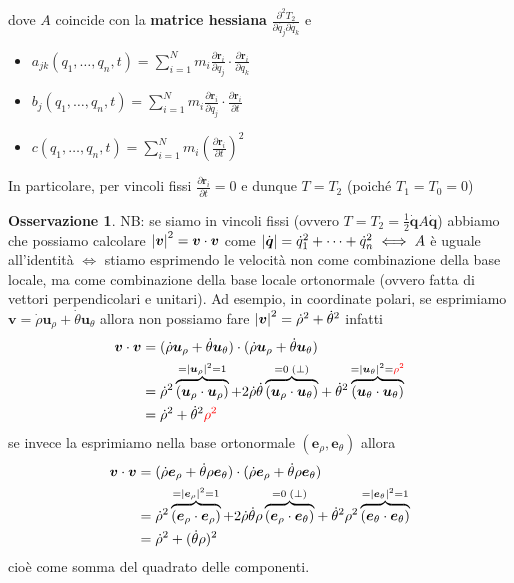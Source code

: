 \documentclass[a4paper,10pt]{article}
\theoremstyle{definition}
\newcommand{\bv}{\boldsymbol} %
\theoremstyle{indentdefinition}
\theoremstyle{indenttheorem}
\theoremstyle{myremark}
\newtheorem*{rem*}{Osservazione}
\theoremstyle{indentgeneral}
\begin{document}
dove $A$ coincide con la \textbf{matrice hessiana} $\frac{\partial^2T_2}{\partial\dot{q_j}\partial\dot{q_k}}$ e 
\begin{itemize}
    \item $a_{jk}(q_1,\dots,q_n,t)=\sum_{i=1}^{N}m_{i}\frac{\partial\boldsymbol{r}_{i}}{\partial q_{j}}\cdot\frac{\partial\boldsymbol{r}_{i}}{\partial q_{k}}$
    \item $b_{j}(q_1,\dots,q_n,t)=\sum_{i=1}^{N}m_{i}\frac{\partial\boldsymbol{r}_{i}}{\partial q_{j}}\cdot\frac{\partial\boldsymbol{r}_{i}}{\partial t}$
    \item $c(q_1,\dots,q_n,t)=\sum_{i=1}^{N}m_{i}\left(\frac{\partial\boldsymbol{r}_{i}}{\partial t}\right)^{2}$
\end{itemize}
In particolare, per vincoli fissi $\frac{\partial\boldsymbol{r}_{i}}{\partial t}=0$
e dunque $T=T_{2}$ (poiché $T_{1}=T_{0}=0$)

\begin{rem*}
    NB: se siamo in vincoli fissi (ovvero $T=T_2=\frac{1}{2}\dot{\bv{q}}A\dot{\bv{q}}$) abbiamo che possiamo calcolare $\abs{\bv{v}}^2=\bv{v}\cdot \bv{v}$ come $\abs{\dot{\bv{q}}}=\dot{q}_1^2+\dots+\dot{q}_n^2\iff A$ è uguale all'identità $\iff$ stiamo esprimendo le velocità non come combinazione della base locale, ma come combinazione della base locale ortonormale (ovvero fatta di vettori perpendicolari e unitari). Ad esempio, in coordinate polari, se esprimiamo $\bv{v}=\dot{\rho}\bv{u}_\rho+\dot{\theta}\bv{u}_\theta$ allora non possiamo fare $\abs{\bv{v}}^2=\dot{\rho}^2+\dot{\theta}^2$ infatti
    \begin{align*}
 \bv{v}\cdot\bv{v}&=(\dot{\rho}\bv{u}_\rho+\dot{\theta}\bv{u}_\theta)\cdot(\dot{\rho}\bv{u}_\rho+\dot{\theta}\bv{u}_\theta) \\
&=\dot{\rho}^2\overbrace{(\bv{u}_\rho\cdot\bv{u}_\rho)}^{=\abs{\bv{u}_\rho}^2=1}+{2\dot{\rho}\dot{\theta}\overbrace{(\bv{u}_\rho\cdot\bv{u}_\theta)}^{=0 \;(\perp)}}+\dot{\theta}^2\overbrace{(\bv{u}_\theta\cdot\bv{u}_\theta)}^{=\abs{\bv{u}_\theta}^2=\textcolor{red}{\rho^2}} \\
 &= \dot{\rho}^2+\dot{\theta}^2\textcolor{red}{\rho^2}
    \end{align*}
    se invece la esprimiamo nella base ortonormale $(\bv{e}_\rho,\bv{e}_\theta)$ allora
    \begin{align*}
         \bv{v}\cdot\bv{v}&=(\dot{\rho}\bv{e}_\rho+\dot{\theta}\rho\bv{e}_\theta)\cdot(\dot{\rho}\bv{e}_\rho+\dot{\theta}\rho\bv{e}_\theta) \\
&=\dot{\rho}^2\overbrace{(\bv{e}_\rho\cdot\bv{e}_\rho)}^{=\abs{\bv{e}_\rho}^2=1}+{2\dot{\rho}\dot{\theta}\rho\overbrace{(\bv{e}_\rho\cdot\bv{e}_\theta)}^{=0 \;(\perp)}}+\dot{\theta}^2\rho^2\overbrace{(\bv{e}_\theta\cdot\bv{e}_\theta)}^{=\abs{\bv{e}_\theta}^2=1} \\
 &= \dot{\rho}^2+(\dot{\theta}\rho)^2
    \end{align*}
    cioè come somma del quadrato delle componenti.
\end{rem*}
\end{document}
